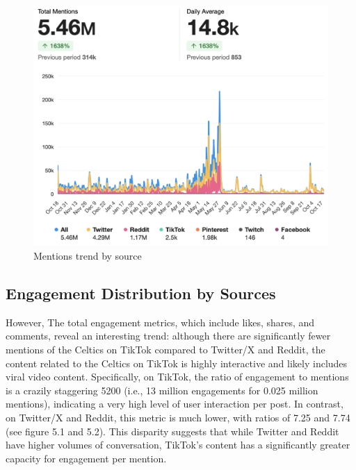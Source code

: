 \documentclass[
]{book}
\begin{document}
\begin{figure}
\centering
\includegraphics{1.png}
\caption{Mentions trend by source}
\end{figure}

\hypertarget{engagement-distribution-by-sources}{%
\subsection{Engagement Distribution by Sources}\label{engagement-distribution-by-sources}}

However, The total engagement metrics, which include likes, shares, and comments, reveal an interesting trend: although there are significantly fewer mentions of the Celtics on TikTok compared to Twitter/X and Reddit, the content related to the Celtics on TikTok is highly interactive and likely includes viral video content. Specifically, on TikTok, the ratio of engagement to mentions is a crazily staggering 5200 (i.e., 13 million engagements for 0.025 million mentions), indicating a very high level of user interaction per post. In contrast, on Twitter/X and Reddit, this metric is much lower, with ratios of 7.25 and 7.74 (see figure 5.1 and 5.2). This disparity suggests that while Twitter and Reddit have higher volumes of conversation, TikTok's content has a significantly greater capacity for engagement per mention.
\end{document}
